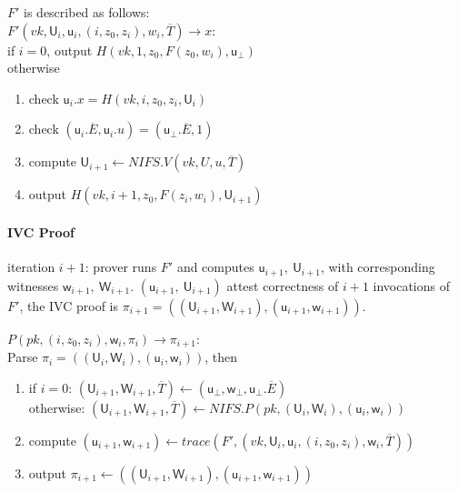 \documentclass{article}
\theoremstyle{definition}
\begin{document}
$F'$ is described as follows:\\
\underline{$F'(vk, \mathsf{U}_i, \mathsf{u}_i, (i, z_0, z_i), w_i, \overline{T}) \rightarrow x$}:\\
if $i=0$, output $H(vk, 1, z_0, F(z_0, w_i), \mathsf{u}_{\bot})$\\
otherwise
\begin{enumerate}
	\item check $\mathsf{u}_i.x = H(vk, i, z_0, z_i, \mathsf{U}_i)$
	\item check $(\mathsf{u}_i.\overline{E}, \mathsf{u}_i.u) = (\mathsf{u}_{\bot}.\overline{E}, 1)$
	\item compute $\mathsf{U}_{i+1} \leftarrow NIFS.V(vk, U, u, \overline{T})$
	\item output $H(vk, i+1, z_0, F(z_i, w_i), \mathsf{U}_{i+1})$
\end{enumerate}


\paragraph{IVC Proof}
iteration $i+1$: prover runs $F'$ and computes $\mathsf{u}_{i+1},~ \mathsf{U}_{i+1}$, with corresponding witnesses $\mathsf{w}_{i+1},~ \mathsf{W}_{i+1}$.
$(\mathsf{u}_{i+1},~ \mathsf{U}_{i+1})$ attest correctness of $i+1$ invocations of $F'$, the IVC proof is $\pi_{i+1} = ( (\mathsf{U}_{i+1}, \mathsf{W}_{i+1}), (\mathsf{u}_{i+1}, \mathsf{w}_{i+1}))$.


\vspace{0.5cm}

\underline{$P(pk, (i, z_0, z_i), \mathsf{w}_i, \pi_i) \rightarrow \pi_{i+1}$}:\\
Parse $\pi_i = ( (\mathsf{U}_i, \mathsf{W}_i), (\mathsf{u}_i, \mathsf{w}_i))$, then
\begin{enumerate}
	\item if $i=0$: $(\mathsf{U}_{i+1}, \mathsf{W}_{i+1}, \overline{T}) \leftarrow (\mathsf{u}_{\perp}, \mathsf{w}_{\perp}, \mathsf{u}_{\perp}.{\overline{E}})$\\
		otherwise: $(\mathsf{U}_{i+1}, \mathsf{W}_{i+1}, \overline{T}) \leftarrow NIFS.P(pk, (\mathsf{U}_i, \mathsf{W}_i), (\mathsf{u}_i, \mathsf{w}_i))$
	\item compute $(\mathsf{u}_{i+1}, \mathsf{w}_{i+1}) \leftarrow trace(F', (vk, \mathsf{U}_i, \mathsf{u}_i, (i, z_0, z_i), \mathsf{w}_i, \overline{T}))$
	\item output $\pi_{i+1} \leftarrow ((\mathsf{U}_{i+1}, \mathsf{W}_{i+1}), (\mathsf{u}_{i+1}, \mathsf{w}_{i+1}))$
\end{enumerate}
\end{document}
